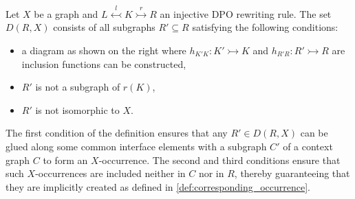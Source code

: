 \begin{definition}
    \label{def:rx}
    Let \(X\) be a graph and 
    \(
        L \overset{l}{\leftarrowtail} K \overset{r}{\rightarrowtail} R
    \) an injective DPO rewriting rule.
    The set \(D(R,X)\) consists of all subgraphs \( R' \subseteq R \)
    satisfying the following conditions:
    \newline
    \noindent
    \begin{minipage}{0.69\textwidth}\setlength{\parindent}{1em}
    \begin{itemize}
        \item a diagram as shown on the right where \(h_{K'K} \colon K' \rightarrowtail K \) and \(h_{R'R} \colon R' \rightarrowtail R \) are inclusion functions can be constructed,
        \item $R'$ is not a subgraph of $r(K)$,
        \item $R'$ is not isomorphic to $X$.
    \end{itemize}
    \end{minipage}
    \begin{minipage}{0.29\textwidth}
        \hfill
    \end{minipage}
\end{definition}  
The first condition of the definition ensures that any $R' \in D(R,X)$ can be glued along some common interface elements with a subgraph $C'$ of a context graph \( C \) to form an \( X \)-occurrence. The second and third conditions ensure that such $X$-occurrences are included neither in \( C \) nor in \( R \), thereby guaranteeing that they are implicitly created as defined in \autoref{def:corresponding_occurrence}.

